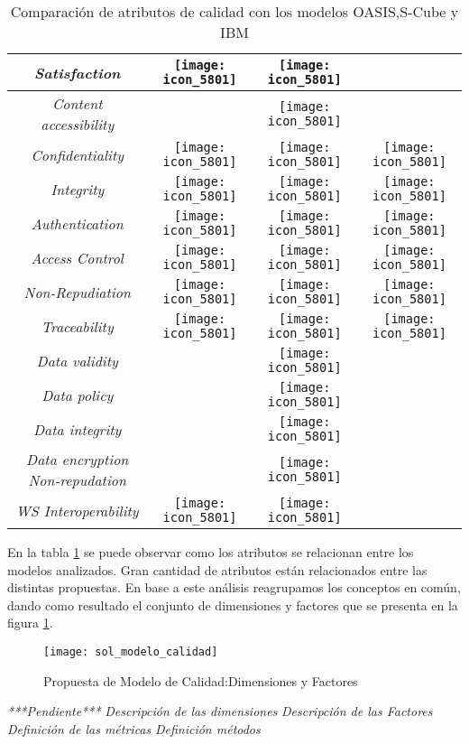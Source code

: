 \begin{table}[h]
\begin{tabular}{ |c | c | c  | c|}
	\hline
     	\emph{Satisfaction} & 
		\texttt{[image: icon\_5801]} & 
		\texttt{[image: icon\_5801]} & \\		
	\hline
     	\emph{Content accessibility} & & 
		\texttt{[image: icon\_5801]} & \\
	\hline
	\hline
     	\emph{Confidentiality} & 
		\texttt{[image: icon\_5801]} & 
		\texttt{[image: icon\_5801]} & 
		\texttt{[image: icon\_5801]} \\
	\hline
     	\emph{Integrity} & 
		\texttt{[image: icon\_5801]} & 
		\texttt{[image: icon\_5801]} & 
		\texttt{[image: icon\_5801]} \\
	\hline
     	\emph{Authentication} & 
		\texttt{[image: icon\_5801]} & 
		\texttt{[image: icon\_5801]} & 
		\texttt{[image: icon\_5801]} \\
	\hline
     	\emph{Access Control} & 
		\texttt{[image: icon\_5801]} & 
		\texttt{[image: icon\_5801]} & 
		\texttt{[image: icon\_5801]} \\
	\hline
     	\emph{Non-Repudiation} & 
		\texttt{[image: icon\_5801]} & 
		\texttt{[image: icon\_5801]} & 
		\texttt{[image: icon\_5801]} \\
	\hline    
     	\emph{Traceability} & 
		\texttt{[image: icon\_5801]} & 
		\texttt{[image: icon\_5801]} & 
		\texttt{[image: icon\_5801]} \\	
	\hline
	\hline	
	  	\emph{Data validity} &  & 
		\texttt{[image: icon\_5801]} &  \\	
	\hline	  
	 	\emph{Data policy} &  & 
		\texttt{[image: icon\_5801]} &  \\
	\hline	
	  	\emph{Data integrity} &  & 
		\texttt{[image: icon\_5801]} &  \\
	\hline	
	   \emph{Data encryption Non-repudation} &  & 
		\texttt{[image: icon\_5801]} &  \\	
	\hline
	\hline
     	\emph{WS Interoperability} & 
		\texttt{[image: icon\_5801]} & 
		\texttt{[image: icon\_5801]} &  \\	
	 \hline
    \end{tabular}
    \caption{Comparación de atributos de calidad con los modelos OASIS,S-Cube y IBM}
    \label{tabla:comparacion_atributos}
  \end{table}
  
En la tabla \ref{tabla:comparacion_atributos} se puede observar como los atributos se relacionan entre los modelos analizados. Gran cantidad de atributos están relacionados entre las distintas propuestas. En base a este análisis reagrupamos los conceptos en común, dando como resultado el conjunto de dimensiones y factores que se presenta en la figura \ref{figura:sol_mod_calidad}.
  \begin{figure}[h]
    \centering
    \texttt{[image: sol\_modelo\_calidad]}
    \caption{Propuesta de Modelo de Calidad:Dimensiones y Factores}
    \label{figura:sol_mod_calidad}
  \end{figure}
  
  \emph{***Pendiente***}
  \emph{Descripción de las dimensiones}
  \emph{Descripción de las Factores}
  \emph{Definición de las métricas}
  \emph{Definición métodos}
